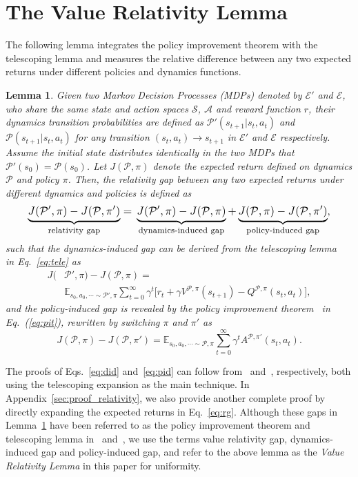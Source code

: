 \documentclass[letterpaper]{article} %
\def\E{{\mathbb{E}}}
\def\P{{\mathcal{P}}}
\def\A{{\mathcal{A}}}
\def\S{{\mathcal{S}}}
\newtheorem{lemma}[theorem]{Lemma}
\begin{document}
\section{The Value Relativity Lemma}
The following lemma integrates the policy improvement theorem with the telescoping lemma and measures the relative difference between any two expected returns under different policies and dynamics functions. 

\begin{lemma}
\label{theo:main}
Given two Markov Decision Processes (MDPs) denoted by $\mathcal{E}'$ and $\mathcal{E}$, who share the same state and action spaces $\S$, $\A$ and reward function $r$, their dynamics transition probabilities are defined as $\P'(s_{t+1}|s_t,a_t)$ and $\P(s_{t+1}|s_t,a_t)$ for any transition $(s_t, a_t)\xrightarrow{}s_{t+1}$ in $\mathcal{E}'$ and $\mathcal{E}$ respectively. Assume the initial state distributes identically in the two MDPs that $\P'(s_0)=\P(s_0)$. Let $J(\P,\pi)$ denote the expected return defined on dynamics $\P$ and policy $\pi$. Then, the relativity gap between any two expected returns under different dynamics and policies is defined as
\begin{equation}
\resizebox{.9\hsize}{!}{$
\underbrace{J(\P',\pi)-J(\P,\pi')}_{\text{relativity gap}}
= \\
\underbrace{J(\P',\pi)-J(\P,\pi)}_{\text{dynamics-induced gap}} +\underbrace{J(\P,\pi)-J(\P,\pi')}_{\text{policy-induced gap}}
$},
\label{eq:rg}
\end{equation}
such that the dynamics-induced gap can be derived from the telescoping lemma~\citep{luo2018algorithmic} in Eq.~\eqref{eq:tele} as
{\small
\begin{equation}
\begin{aligned}
J(&\P',\pi) - J(\P,\pi)= \\
&\E_{s_0,a_0,\cdots\sim \P',\pi}
\sum_{t=0}^\infty
\gamma^t
\big[
r_t
+\gamma V^{\P,\pi}(s_{t+1})-Q^{\P,\pi}(s_t,a_t)
\big],
\label{eq:did}
\end{aligned}    
\end{equation}
}and the policy-induced gap is revealed by the policy improvement theorem~\citep{kakade2002} in Eq.~(\ref{eq:pit}), rewritten by switching $\pi$ and $\pi'$ as
{\small
\begin{equation}
J(\P,\pi)-J(\P,\pi')=\E_{s_0,a_0,\cdots\sim\P,\pi}
\sum_{t=0}^\infty\gamma^t A^{\P,\pi'}(s_t,a_t).
\label{eq:pid}
\end{equation}
}
\end{lemma}
The proofs of Eqs.~\eqref{eq:did} and~\eqref{eq:pid} can follow from~\citep{luo2018algorithmic} and~\citep{kakade2002}, respectively, both using the telescoping expansion as the main technique.
In Appendix~\ref{sec:proof_relativity}, we also provide another complete proof by directly expanding the expected returns in Eq.~\eqref{eq:rg}.
Although these gaps in Lemma~\ref{theo:main} have been referred to as the policy improvement theorem and telescoping lemma in~\citep{luo2018algorithmic} and~\citep{kakade2002}, we use the terms value relativity gap, dynamics-induced gap and policy-induced gap, and refer to the above lemma as the \emph{Value Relativity Lemma} in this paper for uniformity.
\end{document}
